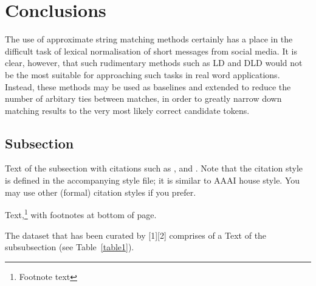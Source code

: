 \documentclass[11pt]{article}
\begin{document}
\section{Conclusions}
The use of approximate string matching methods certainly has a place in the difficult task of lexical normalisation of short messages from social media. It is clear, however, that such rudimentary methods such as LD and DLD would not be the most suitable for approaching such tasks in real word applications. Instead, these methods may be used as baselines and extended to reduce the number of arbitary ties between  matches, in order to greatly narrow down matching results to the very most likely correct candidate tokens. 



\subsection{Subsection}

Text of the subsection with citations such as 
,  and .
Note that the citation style is defined in the accompanying
style file; it is similar to AAAI house style. You may use
other (formal) citation styles if you prefer.


Text,\footnote{Footnote text} with footnotes at bottom of page.


The dataset that has been curated by [1][2] comprises of a 
Text of the subsubsection (see Table~\ref{table1}).






\end{document}
